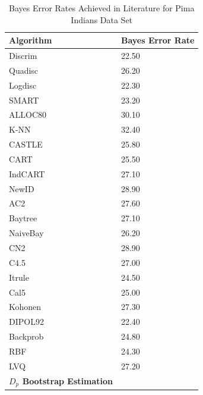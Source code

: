 \documentclass{article}
\begin{document}
	\newpage
		\begin{table}[h]		
			\caption{Bayes Error Rates Achieved in Literature for Pima Indians Data Set}
			\begin{center}
				\begin{tabular}[!h]{ |p{3cm}||p{3cm}|  }
					
					\hline
					Algorithm & Bayes Error Rate \\ [0.5ex] 
					\hline\hline
					
					 Discrim & 22.50	\\
					 Quadisc &  26.20	\\
					 Logdisc &  22.30	\\
					 SMART  & 23.20	\\
					 ALLOC80 &  30.10	\\
					 K-NN  & 32.40	\\
					 CASTLE &  25.80	\\
					 CART  & 25.50	\\
					 IndCART &  27.10	\\
					 NewID &  28.90	\\
					 AC2 &  27.60	\\
					 Baytree  & 27.10	\\
					 NaiveBay &  26.20	\\
					 CN2  & 28.90	\\
					 C4.5  & 27.00	\\
					 Itrule &  24.50	\\
					 Cal5  & 25.00	\\
					 Kohonen &  27.30	\\
					 DIPOL92 &  22.40	\\
					 Backprob  & 24.80	\\
					 RBF  & 24.30	\\
					 LVQ  & 27.20 	\\
					\textbf{$D_p$ Bootstrap Estimation} \\ 
					\hline 		
				\end{tabular}
			\end{center}
		\end{table}
		
\end{document}
